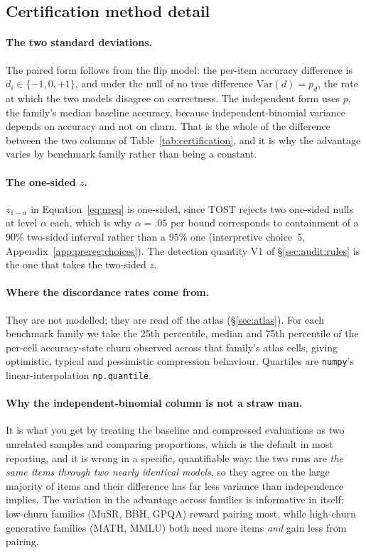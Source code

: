 \subsection{Certification method detail}
\label{app:cert:method}

\paragraph{The two standard deviations.} The paired form follows from the flip
model: the per-item accuracy difference is $d_i \in \{-1,0,+1\}$, and under the
null of no true difference $\mathrm{Var}(d) = p_d$, the rate at which the two
models disagree on correctness. The independent form uses $p$, the family's
median baseline accuracy, because independent-binomial variance depends on
accuracy and not on churn. That is the whole of the difference between the two
columns of Table~\ref{tab:certification}, and it is why the advantage varies by
benchmark family rather than being a constant.

\paragraph{The one-sided $z$.} $z_{1-\alpha}$ in Equation~\eqref{eq:nreq} is
one-sided, since TOST rejects two one-sided nulls at level $\alpha$ each, which
is why $\alpha = .05$ per bound corresponds to containment of a 90\% two-sided
interval rather than a 95\% one (interpretive choice~5,
Appendix~\ref{app:prereg:choices}). The detection quantity V1 of
\S\ref{sec:audit:rules} is the one that takes the two-sided $z$.

\paragraph{Where the discordance rates come from.} They are not modelled; they
are read off the atlas (\S\ref{sec:atlas}). For each benchmark family we take
the 25th percentile, median and 75th percentile of the per-cell accuracy-state
churn observed across that family's atlas cells, giving optimistic, typical and
pessimistic compression behaviour. Quartiles are \texttt{numpy}'s
linear-interpolation \texttt{np.quantile}.

\paragraph{Why the independent-binomial column is not a straw man.} It is what
you get by treating the baseline and compressed evaluations as two unrelated
samples and comparing proportions, which is the default in most reporting, and
it is wrong in a specific, quantifiable way: the two runs are \emph{the same
items through two nearly identical models}, so they agree on the large majority
of items and their difference has far less variance than independence implies.
The variation in the advantage across families is informative in itself:
low-churn families (MuSR, BBH, GPQA) reward pairing most, while high-churn
generative families (MATH, MMLU) both need more items \emph{and} gain less from
pairing.

